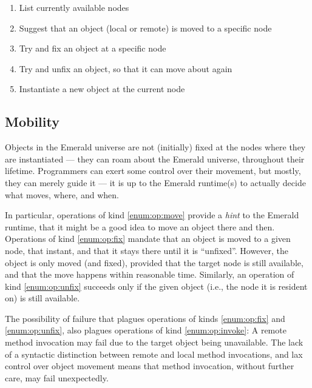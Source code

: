 \begin{enumerate}[label=(1\alph*)]

\item List currently available nodes

\item Suggest that an object (local or remote) is moved to a specific
node \label{enum:op:move}

\item Try and fix an object at a specific node \label{enum:op:fix}

\item Try and unfix an object, so that it can move about again
\label{enum:op:unfix}

\item Instantiate a new object at the current node \label{enum:op:new}

\end{enumerate}

\subsection{Mobility}

Objects in the Emerald universe are not (initially) fixed at the nodes
where they are instantiated --- they can roam about the Emerald
universe, throughout their lifetime. Programmers can exert some
control over their movement, but mostly, they can merely guide it ---
it is up to the Emerald runtime(s) to actually decide what moves,
where, and when.

In particular, operations of kind \ref{enum:op:move} provide a
\emph{hint} to the Emerald runtime, that it might be a good idea to
move an object there and then. Operations of kind \ref{enum:op:fix}
mandate that an object is moved to a given node, that instant, and
that it stays there until it is ``unfixed''. However, the object is
only moved (and fixed), provided that the target node is still
available, and that the move happens within reasonable time.
Similarly, an operation of kind \ref{enum:op:unfix} succeeds only if
the given object (i.e., the node it is resident on) is still
available.

The possibility of failure that plagues operations of kinds
\ref{enum:op:fix} and \ref{enum:op:unfix}, also plagues operations of
kind \ref{enum:op:invoke}: A remote method invocation may fail due to
the target object being unavailable. The lack of a syntactic
distinction between remote and local method invocations, and lax
control over object movement means that method invocation, without
further care, may fail unexpectedly.

